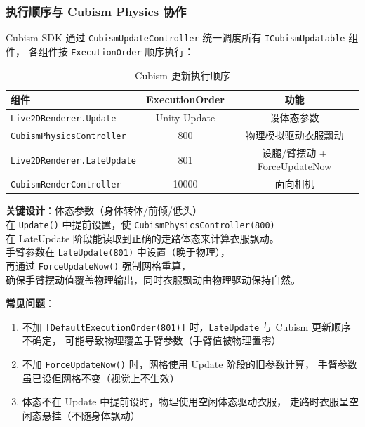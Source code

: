 \documentclass[12pt,a4paper]{ctexart}
\begin{document}
\subsubsection{执行顺序与 Cubism Physics 协作}

Cubism SDK 通过 \texttt{CubismUpdateController} 统一调度所有 \texttt{ICubismUpdatable} 组件，
各组件按 \texttt{ExecutionOrder} 顺序执行：

\begin{table}[H]
\centering
\caption{Cubism 更新执行顺序}
\label{tab:exec-order}
\begin{tabular}{p{}cc}
\toprule
\textbf{组件} & \textbf{ExecutionOrder} & \textbf{功能} \\
\midrule
\texttt{Live2DRenderer.Update} & Unity Update & 设体态参数 \\
\texttt{CubismPhysicsController} & 800 & 物理模拟驱动衣服飘动 \\
\texttt{Live2DRenderer.LateUpdate} & 801 & 设腿/臂摆动 + ForceUpdateNow \\
\texttt{CubismRenderController} & 10000 & 面向相机 \\
\bottomrule
\end{tabular}
\end{table}

\textbf{关键设计}：体态参数（身体转体/前倾/低头）\\
在 \texttt{Update()} 中提前设置，使 \texttt{CubismPhysicsController(800)} \\
在 LateUpdate 阶段能读取到正确的走路体态来计算衣服飘动。\\
手臂参数在 \texttt{LateUpdate(801)} 中设置（晚于物理），\\
再通过 \texttt{ForceUpdateNow()} 强制网格重算，\\
确保手臂摆动值覆盖物理输出，同时衣服飘动由物理驱动保持自然。

\textbf{常见问题}：
\begin{enumerate}
    \item 不加 \texttt{[DefaultExecutionOrder(801)]} 时，\texttt{LateUpdate} 与 Cubism 更新顺序不确定，
        可能导致物理覆盖手臂参数（手臂值被物理置零）
    \item 不加 \texttt{ForceUpdateNow()} 时，网格使用 Update 阶段的旧参数计算，
        手臂参数虽已设但网格不变（视觉上不生效）
    \item 体态不在 Update 中提前设时，物理使用空闲体态驱动衣服，
        走路时衣服呈空闲态悬挂（不随身体飘动）
\end{enumerate}
\end{document}
